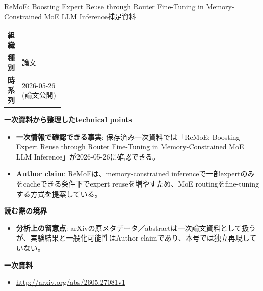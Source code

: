 \begin{technicalnote}{ReMoE: Boosting Expert Reuse through Router Fine-Tuning in Memory-Constrained MoE LLM Inference}{補足資料}
\begingroup
\begin{tabularx}{\linewidth}{@{}>{\bfseries}p{0.22\linewidth}X@{}}
組織 & - \\
種別 & 論文 \\
時系列 & 2026-05-26 (論文公開) \\
\end{tabularx}
\smallskip
{\bfseries 一次資料から整理したtechnical points}
\begin{itemize}[leftmargin=1.5em,itemsep=0.35em]
\item \textbf{一次情報で確認できる事実}: 保存済み一次資料では「ReMoE: Boosting Expert Reuse through Router Fine-Tuning in Memory-Constrained MoE LLM Inference」が2026-05-26に確認できる。
\end{itemize}
\begin{minipage}{\linewidth}
\begin{itemize}[leftmargin=1.5em,itemsep=0.35em]
\item \textbf{Author claim}: ReMoEは、memory-constrained inferenceで一部expertのみをcacheできる条件下でexpert reuseを増やすため、MoE routingをfine-tuningする方式を提案している。
\end{itemize}
{\bfseries 読む際の境界}
\begin{itemize}[leftmargin=1.5em,itemsep=0.35em]
\item \textbf{分析上の留意点}: arXivの原メタデータ／abstractは一次論文資料として扱うが、実験結果と一般化可能性はAuthor claimであり、本号では独立再現していない。
\end{itemize}
\begin{samepage}
{\bfseries 一次資料}
\begingroup\sloppy
\begin{itemize}[leftmargin=1.5em,itemsep=0.25em]
\item {\scriptsize\url{http://arxiv.org/abs/2605.27081v1}}
\end{itemize}
\endgroup
\end{samepage}
\end{minipage}
\endgroup
\end{technicalnote}
\medskip
